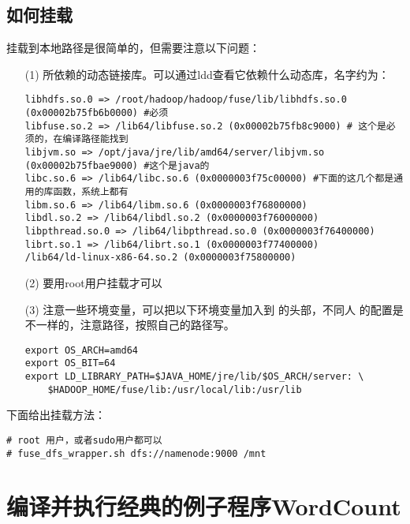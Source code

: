 \documentclass{article}
\begin{document}
\subsection{如何挂载}
挂载到本地路径是很简单的，但需要注意以下问题：
\begin{itemize}
\item[(1)]  所依赖的动态链接库。可以通过ldd查看它依赖什么动态库，名字约为：

\begin{verbatim}
libhdfs.so.0 => /root/hadoop/hadoop/fuse/lib/libhdfs.so.0 (0x00002b75fb6b0000) #必须
libfuse.so.2 => /lib64/libfuse.so.2 (0x00002b75fb8c9000) # 这个是必须的，在编译路径能找到
libjvm.so => /opt/java/jre/lib/amd64/server/libjvm.so (0x00002b75fbae9000) #这个是java的
libc.so.6 => /lib64/libc.so.6 (0x0000003f75c00000) #下面的这几个都是通用的库函数，系统上都有
libm.so.6 => /lib64/libm.so.6 (0x0000003f76800000)
libdl.so.2 => /lib64/libdl.so.2 (0x0000003f76000000)
libpthread.so.0 => /lib64/libpthread.so.0 (0x0000003f76400000)
librt.so.1 => /lib64/librt.so.1 (0x0000003f77400000)
/lib64/ld-linux-x86-64.so.2 (0x0000003f75800000)
\end{verbatim}

\item[(2)] 要用root用户挂载才可以
\item[(3)] 注意一些环境变量，可以把以下环境变量加入到 的头部，不同人
的配置是不一样的，注意路径，按照自己的路径写。

\begin{verbatim}
export OS_ARCH=amd64
export OS_BIT=64
export LD_LIBRARY_PATH=$JAVA_HOME/jre/lib/$OS_ARCH/server: \
	$HADOOP_HOME/fuse/lib:/usr/local/lib:/usr/lib
\end{verbatim}
\end{itemize}

下面给出挂载方法：
\begin{verbatim}
# root 用户，或者sudo用户都可以
# fuse_dfs_wrapper.sh dfs://namenode:9000 /mnt
\end{verbatim}

\section{编译并执行经典的例子程序WordCount}
\end{document}
